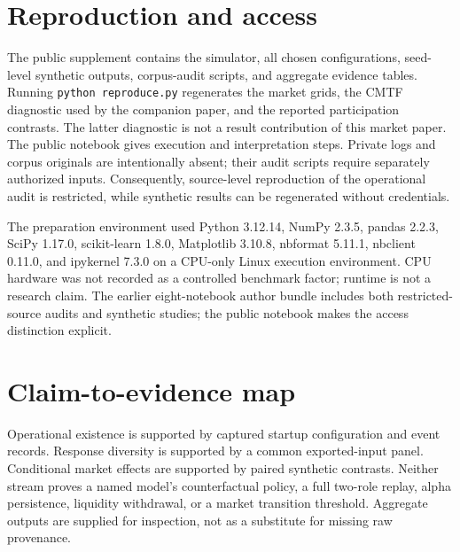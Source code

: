 \section{Reproduction and access}
The public supplement contains the simulator, all chosen configurations, seed-level synthetic outputs, corpus-audit scripts, and aggregate evidence tables. Running \texttt{python reproduce.py} regenerates the market grids, the CMTF diagnostic used by the companion paper, and the reported participation contrasts. The latter diagnostic is not a result contribution of this market paper. The public notebook gives execution and interpretation steps. Private logs and corpus originals are intentionally absent; their audit scripts require separately authorized inputs. Consequently, source-level reproduction of the operational audit is restricted, while synthetic results can be regenerated without credentials.

The preparation environment used Python 3.12.14, NumPy 2.3.5, pandas 2.2.3, SciPy 1.17.0, scikit-learn 1.8.0, Matplotlib 3.10.8, nbformat 5.11.1, nbclient 0.11.0, and ipykernel 7.3.0 on a CPU-only Linux execution environment. CPU hardware was not recorded as a controlled benchmark factor; runtime is not a research claim. The earlier eight-notebook author bundle includes both restricted-source audits and synthetic studies; the public notebook makes the access distinction explicit.

\section{Claim-to-evidence map}
Operational existence is supported by captured startup configuration and event records. Response diversity is supported by a common exported-input panel. Conditional market effects are supported by paired synthetic contrasts. Neither stream proves a named model's counterfactual policy, a full two-role replay, alpha persistence, liquidity withdrawal, or a market transition threshold. Aggregate outputs are supplied for inspection, not as a substitute for missing raw provenance.
